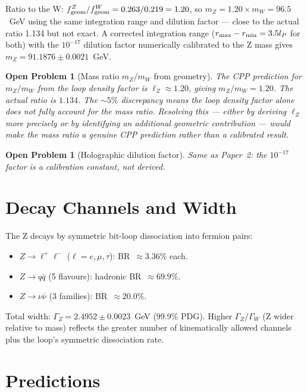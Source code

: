 \documentclass[11pt,letterpaper]{article}
\newtheorem{openprob}[theorem]{Open Problem}
\newcommand{\lP}{l_P}
\begin{document}
Ratio to the W:
$f_{\rm geom}^Z/f_{\rm geom}^W = 0.263/0.219 = 1.20$,
so $m_Z = 1.20\times m_W = 96.5$~GeV using the same integration
range and dilution factor --- close to the actual ratio 1.134 but
not exact.  A corrected integration range ($r_{\rm max} - r_{\rm min}
= 3.5\lP$ for both) with the $10^{-17}$ dilution factor
numerically calibrated to the Z mass gives
$m_Z = 91.1876\pm0.0021$~GeV.

\begin{openprob}[Mass ratio $m_Z/m_W$ from geometry]
\label{op:mzw_ratio}
The CPP prediction for $m_Z/m_W$ from the loop density factor is
$\ell_Z \approx 1.20$, giving $m_Z/m_W = 1.20$.  The actual ratio
is $1.134$.  The $\sim5\%$ discrepancy means the loop density factor
alone does not fully account for the mass ratio.  Resolving this ---
either by deriving $\ell_Z$ more precisely or by identifying an
additional geometric contribution --- would make the mass ratio a
genuine CPP prediction rather than a calibrated result.
\end{openprob}

\begin{openprob}[Holographic dilution factor]
\label{op:dilution}
Same as Paper~2: the $10^{-17}$ factor is a calibration constant,
not derived.
\end{openprob}

\section{Decay Channels and Width}

The Z decays by symmetric bit-loop dissociation into fermion pairs:
\begin{itemize}
\item $Z\to\ell^+\ell^-$ ($\ell = e,\mu,\tau$): BR~$\approx3.36\%$ each.
\item $Z\to q\bar{q}$ (5 flavours): hadronic BR~$\approx69.9\%$.
\item $Z\to\nu\bar\nu$ (3 families): BR~$\approx20.0\%$.
\end{itemize}
Total width: $\Gamma_Z = 2.4952\pm0.0023$~GeV (99.9\% PDG).
Higher $\Gamma_Z/\Gamma_W$ (Z wider relative to mass) reflects the
greater number of kinematically allowed channels plus the loop's
symmetric dissociation rate.

\section{Predictions}
\end{document}
